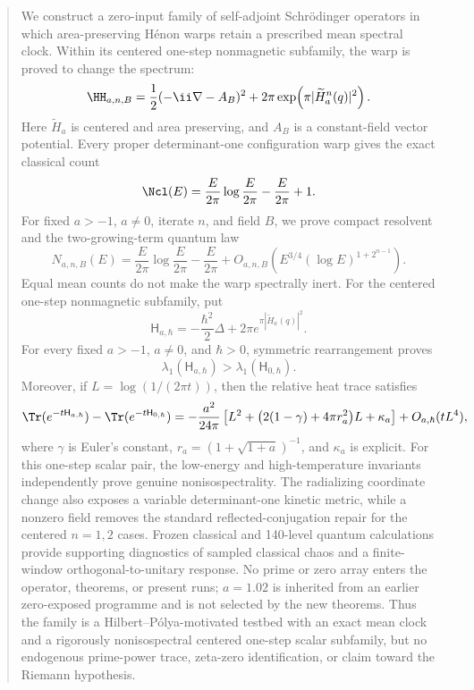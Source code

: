 \begin{abstract}
We construct a zero-input family of self-adjoint Schr\"odinger operators in
which area-preserving H\'enon warps retain a prescribed mean spectral clock.
Within its centered one-step nonmagnetic subfamily, the warp is proved to
change the spectrum:
\[
 \HH_{a,n,B}=\frac12(-\ii\nabla-A_B)^2+
 2\pi\exp\!\left(\pi|\widetilde H_a^n(q)|^2\right).
\]
Here \(\widetilde H_a\) is centered and area preserving, and \(A_B\) is a
constant-field vector potential.  Every proper determinant-one configuration
warp gives the exact classical count
\[
 \Ncl(E)=\frac{E}{2\pi}\log\frac{E}{2\pi}
 -\frac{E}{2\pi}+1.
\]
For fixed \(a>-1\), \(a\neq0\), iterate \(n\), and field \(B\), we prove compact
resolvent and the two-growing-term quantum law
\[
 N_{a,n,B}(E)=\frac{E}{2\pi}\log\frac{E}{2\pi}
 -\frac{E}{2\pi}+
 O_{a,n,B}\!\left(E^{3/4}(\log E)^{1+2^{n-1}}\right).
\]
Equal mean counts do not make the warp spectrally inert.  For the centered
one-step nonmagnetic subfamily, put
\[
 \mathsf H_{a,\hbar}
 =-\frac{\hbar^2}{2}\Delta+
 2\pi e^{\pi|\widetilde H_a(q)|^2}.
\]
For every fixed \(a>-1\), \(a\ne0\), and \(\hbar>0\), symmetric
rearrangement proves
\[
 \lambda_1(\mathsf H_{a,\hbar})>\lambda_1(\mathsf H_{0,\hbar}).
\]
Moreover, if \(L=\log(1/(2\pi t))\), then the relative heat trace satisfies
\[
 \Tr(e^{-t\mathsf H_{a,\hbar}})-\Tr(e^{-t\mathsf H_{0,\hbar}})
 =-\frac{a^2}{24\pi}
 \left[L^2+\bigl(2(1-\gamma)+4\pi r_a^2\bigr)L+\kappa_a\right]
 +O_{a,\hbar}(tL^4),
\]
where \(\gamma\) is Euler's constant,
\(r_a=(1+\sqrt{1+a})^{-1}\), and \(\kappa_a\) is explicit.  For this
one-step scalar pair, the low-energy and high-temperature invariants
independently prove genuine nonisospectrality.  The radializing coordinate
change also exposes a
variable determinant-one kinetic metric, while a nonzero field removes the
standard reflected-conjugation repair for the centered \(n=1,2\) cases.
Frozen classical and 140-level quantum calculations provide supporting
diagnostics of sampled classical chaos and a finite-window
orthogonal-to-unitary response.  No prime or zero
array enters the operator, theorems, or present runs; \(a=1.02\) is inherited
from an earlier zero-exposed programme and is not selected by the new
theorems.  Thus the family is a Hilbert--P\'olya-motivated testbed with an
exact mean clock and a rigorously nonisospectral centered one-step scalar
subfamily, but no endogenous prime-power trace, zeta-zero identification, or
claim toward the Riemann hypothesis.
\end{abstract}
